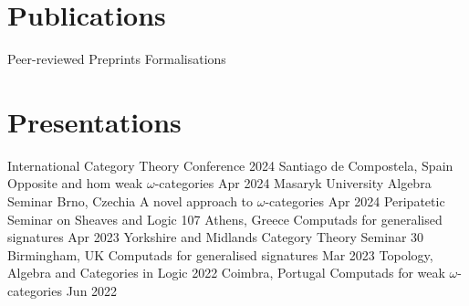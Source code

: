 \documentclass{academic-cv}
\begin{document}
\section*{Publications}
    \nocite{*}
    \begin{cvlist}
        \cvheading
            {Peer-reviewed}
            {}
            {}
            {}
            {\vspace*{-1em}\printbibliography[heading=none,keyword={published}]}
        \cvheading
            {Preprints}
            {}
            {}
            {}
            {\vspace*{-1em}\printbibliography[heading=none,keyword={unpublished}]}
        \cvheading
            {Formalisations}
            {}
            {}
            {}
            {\vspace*{-1em}\printbibliography[heading=none,keyword={code}]}
    \end{cvlist}

\section*{Presentations}
    \begin{cvlist}
        \cvheading
            {International Category Theory Conference 2024}
            {Santiago de Compostela, Spain}
            {Opposite and hom weak \(\omega\)-categories}
            {Apr 2024}
            {}
        \cvheading
            {Masaryk University Algebra Seminar}
            {Brno, Czechia}
            {A novel approach to \(\omega\)-categories}
            {Apr 2024}
            {}
        \cvheading
            {Peripatetic Seminar on Sheaves and Logic 107}
            {Athens, Greece}
            {Computads for generalised signatures}
            {Apr 2023}
            {}
        \cvheading
            {Yorkshire and Midlands Category Theory Seminar 30}
            {Birmingham, UK}
            {Computads for generalised signatures}
            {Mar 2023}
            {}
        \cvheading
            {Topology, Algebra and Categories in Logic 2022}
            {Coimbra, Portugal}
            {Computads for weak \(\omega\)-categories}
            {Jun 2022}
            {}
    \end{cvlist}
\end{document}
